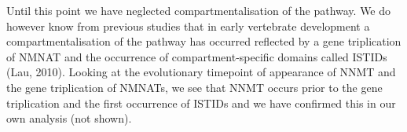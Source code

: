 \documentclass[paper=a4, 12pt]{scrartcl}
\begin{document}
Until this point we have neglected compartmentalisation of the pathway. We do however know from previous studies that in early vertebrate development a compartmentalisation of the pathway has occurred reflected by a gene triplication of NMNAT and the occurrence of compartment-specific domains called ISTIDs (Lau, 2010). Looking at the evolutionary timepoint  of appearance of NNMT and the gene triplication of NMNATs, we see that NNMT occurs prior to the gene triplication and the first occurrence of ISTIDs and we have confirmed this in our own analysis (not shown).



\end{document}
